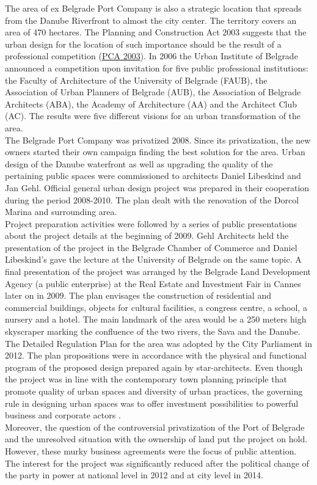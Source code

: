 \documentclass[11pt]{report}
\begin{document}
\begin{itemize}
The area of ex Belgrade Port Company is also a strategic location that spreads from the Danube Riverfront to almost the city center. The territory covers an area of 470 hectares.
The Planning and Construction Act 2003 suggests that the urban design for the location of such importance should be the result of a professional competition (\href{}{PCA 2003}).
In 2006 the Urban Institute of Belgrade announced a competition upon invitation for five public professional institutions: the  Faculty  of  Architecture  of  the  University  of  Belgrade (FAUB),  the Association  of  Urban  Planners  of  Belgrade (AUB),  the Association  of Belgrade Architects (ABA),  the  Academy  of  Architecture (AA)  and  the  Architect Club (AC). The results were five different visions for an urban transformation of the area.
\\
The  Belgrade Port Company was privatized 2008. Since its privatization,  the new owners started their own campaign finding the best solution for the area.
Urban design of the Danube waterfront as well as upgrading the quality of the pertaining public spaces were commissioned to architects Daniel Libeskind and Jan Gehl.
Official general urban design  project was prepared in their cooperation during the period 2008-2010.
The plan dealt with the renovation of the Dorcol Marina and surrounding area.
\\
Project preparation activities were followed by a series of public presentations about the project details at the beginning of 2009. Gehl Architects held the presentation of the project in the Belgrade Chamber of Commerce and Daniel Libeskind's gave the lecture at the University of Belgrade on the same topic.
A final presentation of the project was arranged by the Belgrade Land Development Agency (a public enterprise) at the Real Estate and Investment Fair in Cannes later on in 2009.
The  plan  envisages  the  construction of  residential  and  commercial  buildings,  objects for cultural facilities, a congress centre, a school, a nursery and a hotel.
The main landmark of the area would be a 250 meters high skyscraper marking the confluence of the two rivers, the Sava and the Danube.
\\
The  Detailed  Regulation Plan for the area was adopted by the City  Parliament in 2012. The plan propositions  were in accordance with the physical and functional program of the proposed design prepared again by star-architects.
Even though the project was in  line  with  the contemporary town planning principle that promote quality of urban spaces and diversity of urban practices, the governing rule in designing urban spaces was to offer investment possibilities to powerful business and corporate actors \cite{Vukmirovic in Doytchinov et al 2015}.
\\
Moreover, the question of the controversial privatization of the Port of Belgrade and the unresolved situation with the ownership of land put the project on hold. However, these murky business agreements were the focus of public attention.
The interest for the project was significantly reduced after the political change of the party in power at national level in 2012 and at city level in 2014. 


\end{itemize}
\end{document}
